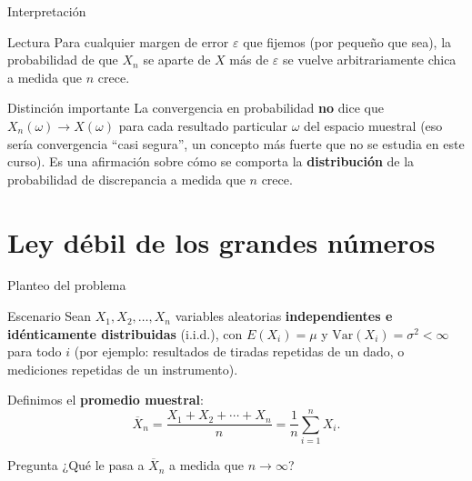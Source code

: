 \documentclass[aspectratio=169,11pt]{beamer}
\begin{document}
\begin{frame}{Interpretación}
\begin{block}{Lectura}
Para cualquier margen de error $\varepsilon$ que fijemos (por pequeño que sea), la probabilidad de que $X_n$ se aparte de $X$ más de $\varepsilon$ se vuelve arbitrariamente chica a medida que $n$ crece.
\end{block}

\begin{alertblock}{Distinción importante}
La convergencia en probabilidad \textbf{no} dice que $X_n(\omega) \to X(\omega)$ para cada resultado particular $\omega$ del espacio muestral (eso sería convergencia ``casi segura'', un concepto más fuerte que no se estudia en este curso). Es una afirmación sobre cómo se comporta la \textbf{distribución} de la probabilidad de discrepancia a medida que $n$ crece.
\end{alertblock}
\end{frame}

\section{Ley débil de los grandes números}

\begin{frame}{Planteo del problema}
\begin{block}{Escenario}
Sean $X_1, X_2, \dots, X_n$ variables aleatorias \textbf{independientes e idénticamente distribuidas} (i.i.d.), con $E(X_i) = \mu$ y $\text{Var}(X_i) = \sigma^2 < \infty$ para todo $i$ (por ejemplo: resultados de tiradas repetidas de un dado, o mediciones repetidas de un instrumento).
\end{block}

Definimos el \textbf{promedio muestral}:
\[
\overline{X}_n = \frac{X_1 + X_2 + \cdots + X_n}{n} = \frac{1}{n}\sum_{i=1}^n X_i.
\]

\begin{alertblock}{Pregunta}
¿Qué le pasa a $\overline{X}_n$ a medida que $n \to \infty$?
\end{alertblock}
\end{frame}
\end{document}
